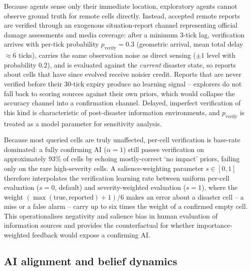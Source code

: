 \documentclass[pdflatex,sn-basic]{sn-jnl}
\begin{document}
Because agents sense only their immediate location, exploratory agents cannot observe ground truth for remote cells directly. Instead, accepted remote reports are verified through an exogenous situation-report channel representing official damage assessments and media coverage: after a minimum 3-tick lag, verification arrives with per-tick probability $p_{\text{verify}} = 0.3$ (geometric arrival, mean total delay $\approx 6$ ticks), carries the same observation noise as direct sensing ($\pm 1$ level with probability 0.2), and is evaluated against the \emph{current} disaster state, so reports about cells that have since evolved receive noisier credit. Reports that are never verified before their 30-tick expiry produce no learning signal -- explorers do not fall back to scoring sources against their own priors, which would collapse the accuracy channel into a confirmation channel. Delayed, imperfect verification of this kind is characteristic of post-disaster information environments, and $p_{\text{verify}}$ is treated as a model parameter for sensitivity analysis.

Because most queried cells are truly unaffected, per-cell verification is base-rate dominated: a fully confirming AI ($\alpha = 1$) still passes verification on approximately 93\% of cells by echoing mostly-correct `no impact' priors, failing only on the rare high-severity cells. A salience-weighting parameter $s \in [0, 1]$ therefore interpolates the verification learning rate between uniform per-cell evaluation ($s = 0$, default) and severity-weighted evaluation ($s = 1$), where the weight $(\max(\text{true}, \text{reported}) + 1)/6$ makes an error about a disaster cell -- a miss or a false alarm -- carry up to six times the weight of a confirmed empty cell. This operationalises negativity and salience bias in human evaluation of information sources and provides the counterfactual for whether importance-weighted feedback would expose a confirming AI.

\subsection{AI alignment and belief dynamics}\label{sec:alignment}
\end{document}
